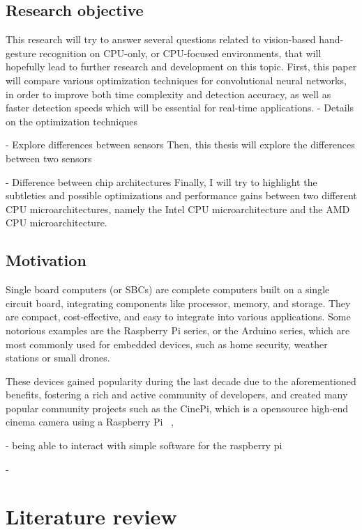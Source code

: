 \documentclass[12pt]{article}
\begin{document}
  \subsection{Research objective}

  This research will try to answer several questions related to vision-based hand-gesture recognition on CPU-only, or CPU-focused environments, that will hopefully lead to further research and development on this topic.
  First, this paper will compare various optimization techniques for convolutional neural networks, in order to improve both time complexity and detection accuracy, as well as faster detection speeds which will be essential for real-time applications. 
  - Details on the optimization techniques

  - Explore differences between sensors
  Then, this thesis will explore the differences between two sensors 

  - Difference between chip architectures
  Finally, I will try to highlight the subtleties and possible optimizations and performance gains between two different CPU microarchitectures, namely the Intel CPU microarchitecture and the AMD CPU microarchitecture. 

  \subsection{Motivation}

  Single board computers (or SBCs) are complete computers built on a single circuit board, integrating components like processor, memory, and storage. They are compact, cost-effective, and easy to integrate into various applications. Some notorious examples are the Raspberry Pi series, or the Arduino series, which are most commonly used for embedded devices, such as home security, weather stations or small drones.

  These devices gained popularity during the last decade due to the aforementioned benefits, fostering a rich and active community of developers, and created many popular community projects such as the CinePi, which is a opensource high-end cinema camera using a Raspberry Pi ~\cite{CINEPI}, %

  - being able to interact with simple software for the raspberry pi

  -

  \section{Literature review}
\end{document}
